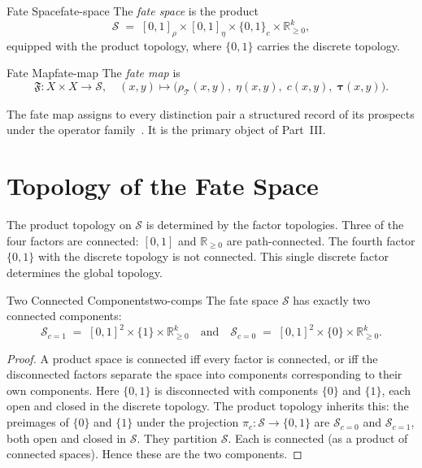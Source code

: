 \documentclass[12pt,twoside,openright]{book}
\newcommand{\transfam}{\mathcal{T}}       %
\newcommand{\fateMap}{\mathfrak{F}}
\newcommand{\fateSpace}{\mathcal{S}}
\newcommand{\survRatio}{\rho}             %
\newcommand{\repEff}{\eta}               %
\newcommand{\collapseInd}{c}             %
\newcommand{\fateComp}[1]{\fateSpace_{\collapseInd=#1}}
\providecommand{\fateComp}[1]{\fateSpace_{\collapseInd=#1}}
\begin{document}
\begin{definition}{Fate Space}{fate-space}
The \emph{fate space} is the product
\[
  \fateSpace
  \;=\;
  [0,1]_{\survRatio}
  \times
  [0,1]_{\repEff}
  \times
  \{0,1\}_{\collapseInd}
  \times
  \mathbb{R}_{\ge0}^{k},
\]
equipped with the product topology, where $\{0,1\}$ carries
the discrete topology.
\end{definition}

\begin{definition}{Fate Map}{fate-map}
The \emph{fate map} is
\[
  \fateMap:X\times X\longrightarrow\fateSpace,
  \quad
  (x,y)\longmapsto
  \bigl(
    \survRatio_\transfam(x,y),\;
    \repEff(x,y),\;
    \collapseInd(x,y),\;
    \boldsymbol{\tau}(x,y)
  \bigr).
\]
\end{definition}

The fate map assigns to every distinction pair a structured
record of its prospects under the operator family~\cite{amari2000}. It is the
primary object of Part~III.

\section{Topology of the Fate Space}

The product topology on $\fateSpace$ is determined by the
factor topologies. Three of the four factors are connected:
$[0,1]$ and $\mathbb{R}_{\ge0}$ are path-connected. The
fourth factor $\{0,1\}$ with the discrete topology is not
connected. This single discrete factor determines the global
topology.

\begin{proposition}{Two Connected Components}{two-comps}
The fate space $\fateSpace$ has exactly two connected
components:
\[
  \fateComp{1}
  \;=\;
  [0,1]^2\times\{1\}\times\mathbb{R}_{\ge0}^k
  \quad\text{and}\quad
  \fateComp{0}
  \;=\;
  [0,1]^2\times\{0\}\times\mathbb{R}_{\ge0}^k.
\]
\begin{proof}
A product space is connected iff every factor is connected, or
iff the disconnected factors separate the space into components
corresponding to their own components. Here $\{0,1\}$ is
disconnected with components $\{0\}$ and $\{1\}$, each
open and closed in the discrete topology. The product topology
inherits this: the preimages of $\{0\}$ and $\{1\}$ under
the projection $\pi_c:\fateSpace\to\{0,1\}$ are
$\fateComp{0}$ and $\fateComp{1}$, both open and closed in
$\fateSpace$. They partition $\fateSpace$. Each is connected
(as a product of connected spaces). Hence these are the two
components.
\end{proof}
\end{proposition}
\end{document}
